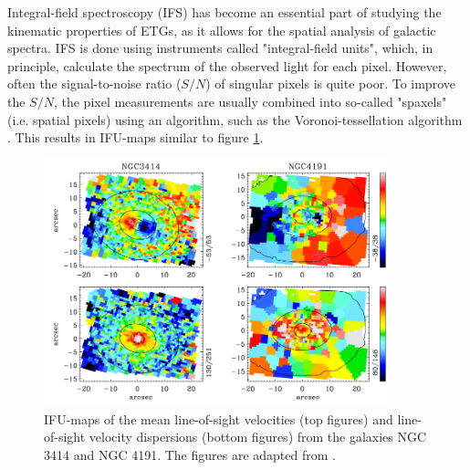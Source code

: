 \documentclass[english, oneside]{HYgradu}
\begin{document}
Integral-field spectroscopy (IFS) has become an essential part of studying the kinematic properties of ETGs, as it allows for the spatial analysis of galactic spectra. IFS is done using instruments called "integral-field units", which, in principle, calculate the spectrum of the observed light for each pixel. However, often the signal-to-noise ratio ($S/N$) of singular pixels is quite poor. To improve the $S/N$, the pixel measurements are usually combined into so-called "spaxels" (i.e. spatial pixels) using an algorithm, such as the Voronoi-tessellation algorithm \citep{Cappellari2003}. This results in IFU-maps similar to figure \ref{figure:krajnovic_ifus}.

\begin{figure}
	\centering
	\includegraphics[width=0.9\textwidth]{krajnovic_ifus.png}
	\caption{IFU-maps of the mean line-of-sight velocities (top figures) and line-of-sight velocity dispersions (bottom figures) from the galaxies NGC 3414 and NGC 4191. The figures are adapted from \cite{Krajnovic2011}.}
	\label{figure:krajnovic_ifus}
\end{figure}
\end{document}
